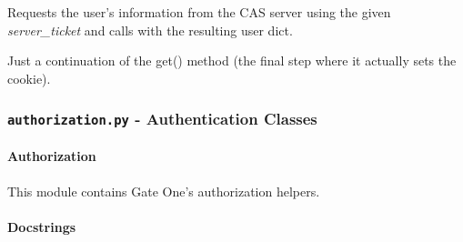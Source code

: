 \documentclass[letterpaper,10pt,openany]{sphinxmanual}
\begin{document}
\begin{fulllineitems}

\begin{fulllineitems}
\label{Developer/authentication:gateone.auth.authentication.CASAuthHandler.get_authenticated_user}
Requests the user's information from the CAS server using the given
\emph{server\_ticket} and calls  with the resulting user
dict.

\end{fulllineitems}


\begin{fulllineitems}
\label{Developer/authentication:gateone.auth.authentication.CASAuthHandler._on_auth}
Just a continuation of the get() method (the final step where it
actually sets the cookie).

\end{fulllineitems}


\end{fulllineitems}



\subsubsection{\texttt{authorization.py} - Authentication Classes}
\label{Developer/authorization:module-gateone.auth.authorization}\label{Developer/authorization:authorization-py-authentication-classes}\label{Developer/authorization::doc}

\paragraph{Authorization}
\label{Developer/authorization:authorization-py}\label{Developer/authorization:authorization}
This module contains Gate One's authorization helpers.


\paragraph{Docstrings}
\label{Developer/authorization:docstrings}
\end{document}
